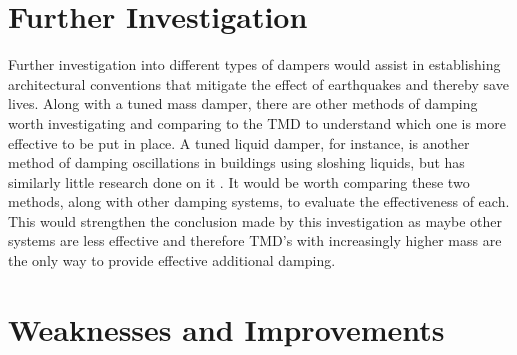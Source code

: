 \documentclass[11pt]{article}
\begin{document}

\section{Further Investigation}
Further investigation into different types of dampers would assist in establishing architectural conventions that mitigate the effect of earthquakes and thereby save lives. Along with a tuned mass damper, there are other methods of damping worth investigating and comparing to the TMD to understand which one is more effective to be put in place. A tuned liquid damper, for instance, is another method of damping oscillations in buildings using sloshing liquids, but has similarly little research done on it \autocite{bozer}. It would be worth comparing these two methods, along with other damping systems, to evaluate the effectiveness of each. This would strengthen the conclusion made by this investigation as maybe other systems are less effective and therefore TMD's with increasingly higher mass are the only way to provide effective additional damping.

\section{Weaknesses and Improvements}
\end{document}
